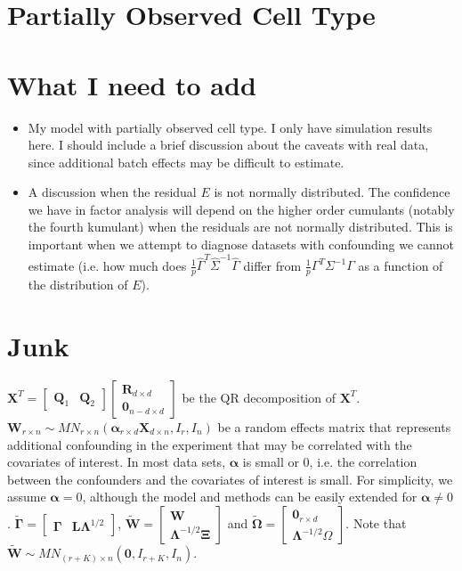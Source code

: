 \documentclass{article}
\begin{document}
\section{Partially Observed Cell Type}



\section{What I need to add}
\begin{itemize}
\item My model with partially observed cell type. I only have simulation results here. I should include a brief discussion about the caveats with real data, since additional batch effects may be difficult to estimate.
\item A discussion when the residual $E$ is not normally distributed. The confidence we have in factor analysis will depend on the higher order cumulants (notably the fourth kumulant) when the residuals are not normally distributed. This is important when we attempt to diagnose datasets with confounding we cannot estimate (i.e. how much does $\frac{1}{p}\hat{\Gamma}^T\hat{\Sigma}^{-1}\hat{\Gamma}$ differ from $\frac{1}{p}\Gamma^T \Sigma^{-1}\Gamma$ as a function of the distribution of $E$).
\end{itemize}


 

\section{Junk}
$\bm{X}^T = \left[ \begin{matrix}
\bm{Q}_1 & \bm{Q}_2
\end{matrix} \right]\left[ \begin{matrix}
\bm{R}_{d \times d}\\
\bm{0}_{n-d \times d}
\end{matrix} \right]$ be the QR decomposition of $\bm{X}^T$. $\bm{W}_{r \times n} \sim MN_{r \times n}\left( \bm{\alpha}_{r \times d}\bm{X}_{d \times n}, I_{r}, I_{n} \right)$ be a random effects matrix that represents additional confounding in the experiment that may be correlated with the covariates of interest. In most data sets, $\bm{\alpha}$ is small or 0, i.e. the correlation between the confounders and the covariates of interest is small. For simplicity, we assume $\bm{\alpha}=0$, although the model and methods can be easily extended for $\bm{\alpha} \neq 0$. $\bm{\tilde{\Gamma}} = \left[ \begin{matrix}
\bm{\Gamma} & \bm{L} \bm{\Lambda}^{1/2}
\end{matrix} \right]$, $\bm{\tilde{W}} = \left[ \begin{matrix}
\bm{W}\\
\bm{\Lambda}^{-1/2}\bm{\Xi}
\end{matrix} \right]$ and $\bm{\tilde{\Omega}} = \left[ \begin{matrix}
\bm{0}_{r \times d}\\
\bm{\Lambda}^{-1/2} \Omega
\end{matrix} \right]$. Note that $\bm{\tilde{W}} \sim MN_{\left( r+K \right)\times n}\left( \bm{0}, I_{r+K}, I_n \right)$.
\end{document}
